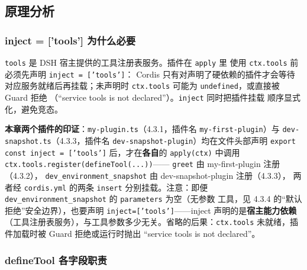 \subsection{原理分析}

\subsubsection{inject = ['tools'] 为什么必要}

\texttt{tools} 是 DSH 宿主提供的工具注册表服务。插件在 \texttt{apply} 里
使用 \texttt{ctx.tools} 前必须先声明 \texttt{inject = ['tools']}：
Cordis 只有对声明了硬依赖的插件才会等待对应服务就绪后再挂载；未声明时
\texttt{ctx.tools} 可能为 \texttt{undefined}，或直接被 Guard 拒绝
（``service tools is not declared''）。\texttt{inject} 同时把插件挂载
顺序显式化，避免竞态。

\textbf{本章两个插件的印证}：\texttt{my-plugin.ts}（4.3.1，插件名
\texttt{my-first-plugin}）与 \texttt{dev-snapshot.ts}（4.3.3，插件名
\texttt{dev-snapshot-plugin}）均在文件头部声明
\texttt{export const inject = ['tools']} 后，才在\textbf{各自}的
\texttt{apply(ctx)} 中调用 \texttt{ctx.tools.register(defineTool(...))}——
\texttt{greet} 由 my-first-plugin 注册（4.3.2），
\texttt{dev\_environment\_snapshot} 由 dev-snapshot-plugin 注册（4.3.3），
两者经 \texttt{cordis.yml} 的两条 \texttt{insert} 分别挂载。注意：即便
\texttt{dev\_environment\_snapshot} 的 \texttt{parameters} 为空（无参数
工具，见 4.3.4 的``默认拒绝''安全边界），也要声明
\texttt{inject=['tools']}——inject 声明的是\textbf{宿主能力依赖}
（工具注册表服务），与工具参数多少无关。省略的后果：\texttt{ctx.tools}
未就绪，插件加载时被 Guard 拒绝或运行时抛出
``service tools is not declared''。

\subsubsection{defineTool 各字段职责}

